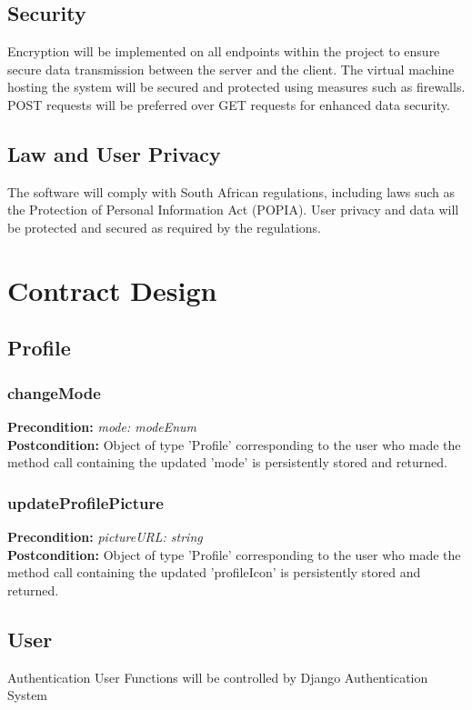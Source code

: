 \documentclass[12pt]{article}
\begin{document}
\subsection{Security}
Encryption will be implemented on all endpoints within the project to ensure secure data transmission between the server and the client. The virtual machine hosting the system will be secured and protected using measures such as firewalls. POST requests will be preferred over GET requests for enhanced data security.

\subsection{Law and User Privacy}
The software will comply with South African regulations, including laws such as the Protection of Personal Information Act (POPIA). User privacy and data will be protected and secured as required by the regulations.


\newpage

\section{Contract Design}

\subsection{Profile}

\subsubsection*{changeMode}
\textbf{Precondition:} \textit{mode: modeEnum} \\
\textbf{Postcondition:} Object of type 'Profile' corresponding to the user who made the method call containing the updated 'mode' is persistently stored and returned.

\subsubsection*{updateProfilePicture}
\textbf{Precondition:} \textit{pictureURL: string} \\
\textbf{Postcondition:} Object of type 'Profile' corresponding to the user who made the method call containing the updated 'profileIcon' is persistently stored and returned.

\subsection{User}
Authentication User Functions will be controlled by Django Authentication System
\end{document}

